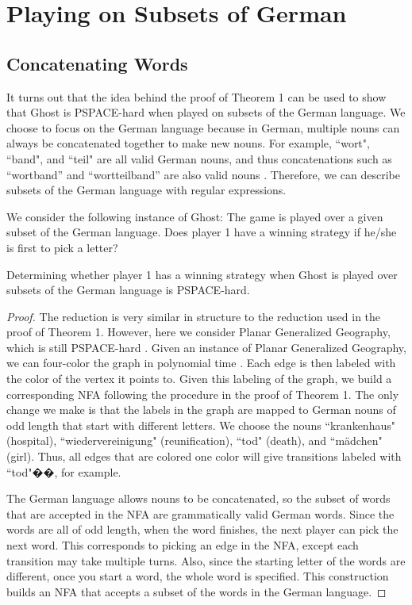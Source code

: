 \documentclass[runningheads,a4paper]{llncs}
\begin{document}
\section{Playing on Subsets of German}

\subsection{Concatenating Words}



It turns out that the idea behind the proof of Theorem 1 can be used to show that Ghost is PSPACE-hard when played on subsets of the German language. We choose to focus on the German language because in German, multiple nouns can always be concatenated together to make new nouns. For example, ``wort", ``band", and ``teil" are all valid German nouns, and thus concatenations such as “wortband” and “wortteilband” are also valid nouns \cite{german}. Therefore, we can describe subsets of the German language with regular expressions.

We consider the following instance of Ghost: The game is played over a given subset of the German language. Does player 1 have a winning strategy if he/she is first to pick a letter?

\begin{theorem}Determining whether player 1 has a winning strategy when Ghost is played over subsets of the German language is PSPACE-hard.
\end{theorem}

\begin{proof} The reduction is very similar in structure to the reduction used in the proof of Theorem 1. However, here we consider Planar Generalized Geography, which is still PSPACE-hard \cite{Sipser}. Given an instance of Planar Generalized Geography, we can four-color the graph in polynomial time \cite{planargraph}. Each edge is then labeled with the color of the vertex it points to. Given this labeling of the graph, we build a corresponding NFA following the procedure in the proof of Theorem 1. The only change we make is that the labels in the graph are mapped to German nouns of odd length that start with different letters. We choose the nouns ``krankenhaus" (hospital), ``wiedervereinigung" (reunification), ``tod" (death), and ``m{\"a}dchen" (girl). Thus, all edges that are colored one color will give transitions labeled with ``tod"��, for example. 

	The German language allows nouns to be concatenated, so the subset of words that are accepted in the NFA are grammatically valid German words. Since the words are all of odd length, when the word finishes, the next player can pick the next word. This corresponds to picking an edge in the NFA, except each transition may take multiple turns. Also, since the starting letter of the words are different, once you start a word, the whole word is specified. This construction builds an NFA that accepts a subset of the words in the German language. 
\end{proof}
\end{document}
